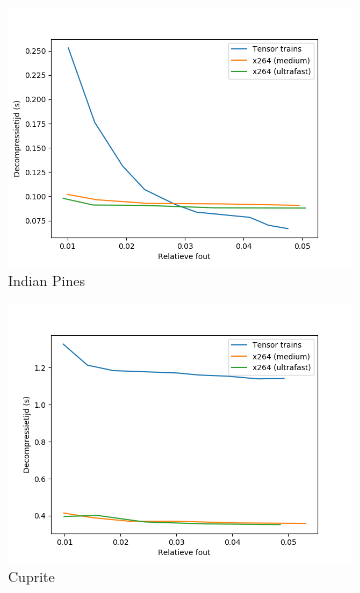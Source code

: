 \newpage
\begin{figure}[H]
\centering
\begin{subfigure}{0.48\textwidth}
  \centering
  \includegraphics[width=\linewidth]{images/general_comparison_decompression_times_Indian_Pines.png}
  \caption{Indian Pines}
\end{subfigure}
\begin{subfigure}{0.48\textwidth}
  \centering
  \includegraphics[width=\linewidth]{images/general_comparison_decompression_times_Cuprite.png}
  \caption{Cuprite}
\end{subfigure}
\\
\begin{subfigure}{0.48\textwidth}
  \centering

\end{subfigure}
\end{figure}
